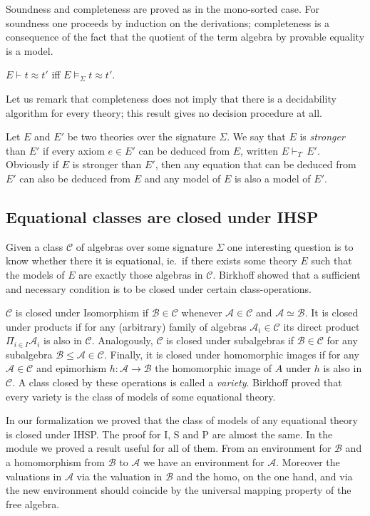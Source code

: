 Soundness and completeness are proved as in the
mono-sorted case. For soundness one proceeds by induction on the
derivations; completeness is a consequence of the fact that the quotient of the
term algebra by provable equality is a model.
\begin{theorem}
  $E \vdash t ≈ t'$ iff $E \models_{\Sigma} t ≈ t'$.
\end{theorem}
\noindent Let us remark that completeness does not imply that there is a
decidability algorithm for every theory; \ie this result gives no decision
procedure at all.

Let $E$ and $E'$ be two theories over the signature $\Sigma$. We say
that $E$ is \emph{stronger} than $E'$ if every axiom $e \in E'$ can be
deduced from $E$, written $E \vdash_{T}\, E'$.  Obviously if $E$
is stronger than $E'$, then any equation that can be deduced from $E'$
can also be deduced from $E$ and any model of $E$ is also a model of
$E'$.

\subsection{Equational classes are closed under IHSP}

Given a class $\mathcal{C}$ of algebras over some signature $\Sigma$
one interesting question is to know whether there it is equational,
ie.\ if there exists some theory $E$ such that the models of $E$ are
exactly those algebras in $\mathcal{C}$. Birkhoff showed that a
sufficient and necessary condition is to be closed under certain
class-operations.

$\mathcal{C}$ is closed under Isomorphism if
$\mathcal{B}\in \mathcal{C}$ whenever $\mathcal{A}\in \mathcal{C}$ and
$\mathcal{A}\simeq \mathcal{B}$. It is closed under products if for
any (arbitrary) family of algebras $\mathcal{A}_i\in \mathcal{C}$ its
direct product $\Pi_{i\in I} \mathcal{A}_i$ is also in
$\mathcal{C}$. Analogously, $\mathcal{C}$ is closed under subalgebras
if $\mathcal{B}\in \mathcal{C}$ for any subalgebra
$\mathcal{B}\leqslant \mathcal{A} \in \mathcal{C}$. Finally, it is
closed under homomorphic images if for any
$\mathcal{A} \in \mathcal{C}$ and epimorhism
$h : \mathcal{A} \to \mathcal{B}$ the homomorphic image of $A$ under
$h$ is also in $\mathcal{C}$. A class closed by these operations is
called a \emph{variety}. Birkhoff proved that every variety is the
class of models of some equational theory.

In our formalization we proved that the class of models of any
equational theory is closed under IHSP. The proof for I, S and P are
almost the same. In the module  we proved a result
useful for all of them. From an environment for $\mathcal{B}$ and a
homomorphism from $\mathcal{B}$ to $\mathcal{A}$ we have an
environment for $\mathcal{A}$. Moreover the valuations in
$\mathcal{A}$ via the valuation in $\mathcal{B}$ and the homo, on the
one hand, and via the new environment should coincide by the universal
mapping property of the free algebra.

